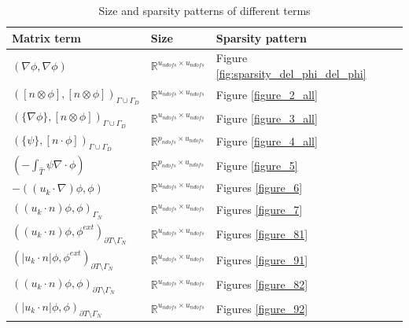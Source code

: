 \documentclass[a4paper]{book}
\begin{document}
\begin{table}[H]
\caption{Size and sparsity patterns of different terms}
\begin{center}
\begin{tabular}{|p{}| p{} |  p{}|}
\hline
\textbf{Matrix term} & \textbf{Size} & \textbf{Sparsity pattern} \\
\hline
$(\nabla \phi, \nabla \phi)$ & $\mathbb{R}^{u_{ndofs} \times u_{ndofs}}$ & Figure \ref{fig:sparsity_del_phi_del_phi}\\
\hline
$([n \otimes \phi],[n \otimes \phi])_{\Gamma \cup \Gamma_D}$ & $\mathbb{R}^{u_{ndofs} \times u_{ndofs}}$ & Figure \ref{figure_2_all}\\
\hline
$(\lbrace \nabla \phi \rbrace,[n \otimes \phi])_{\Gamma \cup \Gamma_D}$ & $\mathbb{R}^{u_{ndofs} \times u_{ndofs}}$ & Figure \ref{figure_3_all}\\
\hline
$(\lbrace \psi \rbrace,[n \cdot \phi])_{\Gamma \cup \Gamma_D}$ & $\mathbb{R}^{p_{ndofs} \times u_{ndofs}}$ & Figure \ref{figure_4_all}\\
\hline
$(- \int_{\hat{T}} \psi \nabla \cdot \phi)$ & $\mathbb{R}^{p_{ndofs} \times u_{ndofs}}$ & Figure \ref{figure_5} \\
\hline
$-((u_k \cdot \nabla)\phi , \phi)$ & $\mathbb{R}^{u_{ndofs} \times u_{ndofs}}$ & Figures \ref{figure_6}\\
\hline
$((u_k \cdot n)\phi , \phi)_{\Gamma_N}$ & $\mathbb{R}^{u_{ndofs} \times u_{ndofs}}$ & Figures \ref{figure_7}\\
\hline
$((u_k \cdot n)\phi,\phi^{ext})_{\partial T \setminus \Gamma_N}$ & $\mathbb{R}^{u_{ndofs} \times u_{ndofs}}$ & Figures \ref{figure_81}\\
\hline
$(|u_k \cdot n|\phi,\phi^{ext})_{\partial T \setminus \Gamma_N}$ & $\mathbb{R}^{u_{ndofs} \times u_{ndofs}}$ & Figures \ref{figure_91}\\
\hline
$((u_k \cdot n)\phi,\phi)_{\partial T \setminus \Gamma_N}$ & $\mathbb{R}^{u_{ndofs} \times u_{ndofs}}$ & Figures \ref{figure_82}\\
\hline
$(|u_k \cdot n|\phi,\phi)_{\partial T \setminus \Gamma_N}$ & $\mathbb{R}^{u_{ndofs} \times u_{ndofs}}$ & Figures \ref{figure_92}\\
\hline
\end{tabular}
\end{center}
\end{table}
\end{document}
